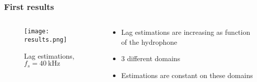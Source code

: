 \documentclass[UKenglish,8pt,aspectratio=1610]{beamer}
\begin{document}
\begin{frame}
	\frametitle{First results}
		\begin{columns}
		\begin{column}{0.5\textwidth}
			\vspace{-25pt}
			\begin{figure}[h!]
				\texttt{[image: results.png]}
				\centering
				\caption{Lag estimations, $f_s=40~\si{\kilo\hertz}$}
			\end{figure}
		\end{column}
		\begin{column}{0.5\textwidth}
		\begin{itemize}
			\item Lag estimations are increasing as function of the hydrophone
			\item 3 different domains
			\item Estimations are constant on these domains
		\end{itemize}
		\end{column}
	\end{columns} 
\end{frame}
\end{document}
